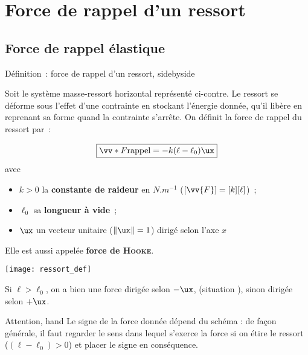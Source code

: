 \documentclass[../main/main.tex]{subfiles}
\begin{document}
\section{Force de rappel d'un ressort}
\subsection{Force de rappel élastique}

\begin{tdefi}{Définition~: force de rappel d'un ressort, sidebyside}

    Soit le système masse-ressort horizontal représenté ci-contre. Le ressort se
    déforme sous l'effet d'une contrainte en stockant l'énergie donnée, qu'il
    libère en reprenant sa forme quand la contrainte s'arrête. On définit la
    force de rappel du ressort par~:

    \begin{equation*}
        \boxed{\vv*{F}{\rm rappel} = -k(\ell - \ell_0)\ux}
    \end{equation*}
    avec

    \begin{itemize}
        \item $k > 0$ la \textbf{constante de raideur} en $\si{N.m^{-1}}$
            ($[\vv{F}] = [k][\ell]$)~;
        \item $\ell_0$ sa \textbf{longueur à vide}~;
        \item $\ux$ un vecteur unitaire ($ \left\Vert \ux \right\Vert = 1$)
            dirigé selon l'axe $x$
    \end{itemize}

    \begin{center}
        Elle est aussi appelée \textbf{force de \textsc{Hooke}}.
    \end{center}

    \tcblower
    \begin{center}
        \texttt{[image: ressort\_def]}
    \end{center}

    Si $\ell > \ell_0$, on a bien une force dirigée selon $-\ux$, (situation
    ), sinon dirigée selon $+\ux$.

\end{tdefi}

\begin{tror}{Attention, hand}
    Le signe de la force donnée dépend du schéma : de façon générale, il faut
    regarder le sens dans lequel s’exerce la force si on étire le ressort ($(\ell
    - \ell_0) > 0$) et placer le signe en conséquence.
\end{tror}
\end{document}
